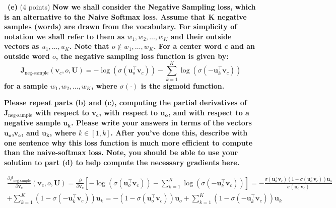 \documentclass[a4 paper]{article}
\newcommand{\subproblem}[1]{~\newline\textbf{(#1)}}
\newcommand{\bb}[1]{$\boldsymbol{#1}$}
\begin{document}
\subproblem{e} (4 points) \textbf{Now we shall consider the Negative Sampling loss, which is an alternative to the Naive Softmax loss.
Assume that K negative samples (words) are drawn from the vocabulary.
For simplicity of notation we shall refer to them as $w_1,w_2,\dots,w_K$ and their outside vectors as $u_1,\dots,u_K$.
Note that $o\not\in {w_1,\dots,w_K}$.
For a center word c and an outside word $o$, the negative sampling loss function is given by:}
\begin{equation}
    \boldsymbol{J}_{\text {neg-sample}}\left(\boldsymbol{v}_{c}, o, \boldsymbol{U}\right)
    = - \log \left(\sigma\left(\boldsymbol{u}_{o}^{\top} \boldsymbol{v}_{c}\right)\right)-\sum_{k=1}^{K} \log \left(\sigma\left(-\boldsymbol{u}_{k}^{\top} \boldsymbol{v}_{c}\right)\right)
\end{equation}
\textbf{for a sample $w_1,w_2,\dots,w_K$, where $\sigma(\cdot)$ is the sigmoid function.}

\textbf{Please repeat parts (b) and (c), computing the partial derivatives of $\boldsymbol{J}_{\text {neg-sample}}$ with respect to \bb{v_c}, with respect to \bb{u_o}, and with respect to a negative sample \bb{u_k}.
Please write your answers in terms of the vectors \bb{u_o},\bb{v_c}, and \bb{u_k}, where $k \in [1,k]$.
After you've done this, describe with one sentence why this loss function is much more efficient to compute than the naive-softmax loss.
Note, you should be able to use your solution to part (d) to help compute the necessary gradients here.}

\begin{equation}
    \begin{aligned}
        \frac{\partial \mathcal J_{\text {neg-sample}}}{\partial \boldsymbol{v}_c}
        \left(\boldsymbol{v}_{c}, o, \boldsymbol{U}\right)
        = \frac{\partial}{\partial \boldsymbol{v}_c} [- \log \left(\sigma\left(\boldsymbol{u}_{o}^{\top} \boldsymbol{v}_{c}\right)\right) - \sum_{k=1}^{K} \log \left(\sigma\left(-\boldsymbol{u}_{k}^{\top} \boldsymbol{v}_{c}\right)\right)]
        = - \frac{\sigma\left(\boldsymbol{u}_{o}^{\top} \boldsymbol{v}_{c}\right)(1-\sigma\left(\boldsymbol{u}_{o}^{\top} \boldsymbol{v}_{c}\right))\boldsymbol{u}_{o}}{\sigma\left(\boldsymbol{u}_{o}^{\top} \boldsymbol{v}_{c}\right)} \\
        + \sum_{k=1}^{K} \left(1- \sigma\left(-\boldsymbol{u}_{k}^{\top} \boldsymbol{v}_{c}\right)\right)\boldsymbol{u}_{k}
        = -(1-\sigma\left(\boldsymbol{u}_{o}^{\top} \boldsymbol{v}_{c}\right))\boldsymbol{u}_{o} + \sum_{k=1}^{K} \left(1- \sigma\left(-\boldsymbol{u}_{k}^{\top} \boldsymbol{v}_{c}\right)\right)\boldsymbol{u}_{k}
    \end{aligned}
\end{equation}
\end{document}
